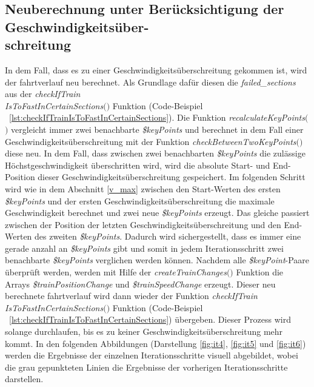 \subsection{Neuberechnung unter Berücksichtigung der Geschwindigkeitsüber-\\schreitung}  \label{neuberechnung}
In dem Fall, dass es zu einer Geschwindigkeitsüberschreitung gekommen ist, wird der \Gls{fahrtverlauf} neu berechnet. Als Grundlage dafür diesen die \textit{\grqq{}failed\_sections\grqq{}} aus der \textit{check\-If\-Train\\Is\-To\-Fast\-In\-Certain\-Sections$($$)$} Funktion (Code-Beispiel ~\ref{lst:checkIfTrainIsToFastInCertainSections}). Die Funktion \textit{recalculate\-Key\-Points$($$)$} vergleicht immer zwei benachbarte \textit{\$keyPoints} und berechnet in dem Fall einer Geschwindigkeitsüberschreitung mit der Funktion \textit{checkBetweenTwoKeyPoints$($$)$} diese neu. In dem Fall, dass zwischen zwei benachbarten \textit{\$keyPoints} die zulässige Höchstgeschwindigkeit überschritten wird, wird die absolute Start- und End-Position dieser Geschwindigkeitsüberschreitung gespeichert. Im folgenden Schritt wird wie in dem Abschnitt \ref{v_max} zwischen den Start-Werten des ersten \textit{\$keyPoints} und der ersten Geschwindigkeitsüberschreitung die maximale Geschwindigkeit berechnet und zwei neue \textit{\$keyPoints} erzeugt. Das gleiche passiert zwischen der Position der letzten Geschwindigkeitsüberschreitung und den End-Werten des zweiten \textit{\$keyPoints}. Dadurch wird sichergestellt, dass es immer eine gerade anzahl an \textit{\$keyPoints} gibt und somit in jedem Iterationsschritt zwei benachbarte \textit{\$keyPoints} verglichen werden können. Nachdem alle \textit{\$keyPoint}-Paare überprüft werden, werden mit Hilfe der \textit{createTrainChanges$($$)$} Funktion die Arrays \textit{\$trainPositionChange} und \textit{\$trainSpeedChange} erzeugt. Dieser neu berechnete \Gls{fahrtverlauf} wird dann wieder der Funktion \textit{checkIfTrain\\IsToFastInCertainSections$($$)$} Funktion (Code-Beispiel ~\ref{lst:checkIfTrainIsToFastInCertainSections}) übergeben. Dieser Prozess wird solange durchlaufen, bis es zu keiner Geschwindigkeitsüberschreitung mehr kommt. In den folgenden Abbildungen (Darstellung \ref{fig:it4}, \ref{fig:it5} und \ref{fig:it6}) werden die Ergebnisse der einzelnen Iterationsschritte visuell abgebildet, wobei die grau gepunkteten Linien die Ergebnisse der vorherigen Iterationsschritte darstellen.
